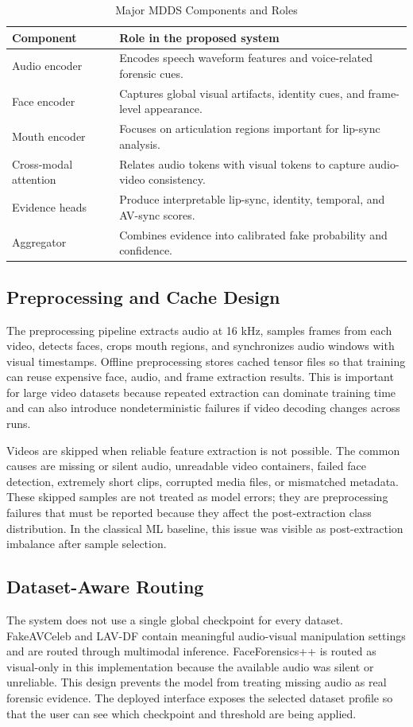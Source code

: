 \documentclass[conference]{IEEEtran}
\begin{document}
\begin{table}[htbp]
\caption{Major MDDS Components and Roles}
\centering
\begin{tabular}{p{1.65cm}p{5.65cm}}
\toprule
Component & Role in the proposed system \\
\midrule
Audio encoder & Encodes speech waveform features and voice-related forensic cues. \\
Face encoder & Captures global visual artifacts, identity cues, and frame-level appearance. \\
Mouth encoder & Focuses on articulation regions important for lip-sync analysis. \\
Cross-modal attention & Relates audio tokens with visual tokens to capture audio-video consistency. \\
Evidence heads & Produce interpretable lip-sync, identity, temporal, and AV-sync scores. \\
Aggregator & Combines evidence into calibrated fake probability and confidence. \\
\bottomrule
\end{tabular}
\end{table}

\subsection{Preprocessing and Cache Design}
The preprocessing pipeline extracts audio at 16 kHz, samples frames from each video, detects faces, crops mouth regions, and synchronizes audio windows with visual timestamps. Offline preprocessing stores cached tensor files so that training can reuse expensive face, audio, and frame extraction results. This is important for large video datasets because repeated extraction can dominate training time and can also introduce nondeterministic failures if video decoding changes across runs.

Videos are skipped when reliable feature extraction is not possible. The common causes are missing or silent audio, unreadable video containers, failed face detection, extremely short clips, corrupted media files, or mismatched metadata. These skipped samples are not treated as model errors; they are preprocessing failures that must be reported because they affect the post-extraction class distribution. In the classical ML baseline, this issue was visible as post-extraction imbalance after sample selection.

\subsection{Dataset-Aware Routing}
The system does not use a single global checkpoint for every dataset. FakeAVCeleb and LAV-DF contain meaningful audio-visual manipulation settings and are routed through multimodal inference. FaceForensics++ is routed as visual-only in this implementation because the available audio was silent or unreliable. This design prevents the model from treating missing audio as real forensic evidence. The deployed interface exposes the selected dataset profile so that the user can see which checkpoint and threshold are being applied.
\end{document}
